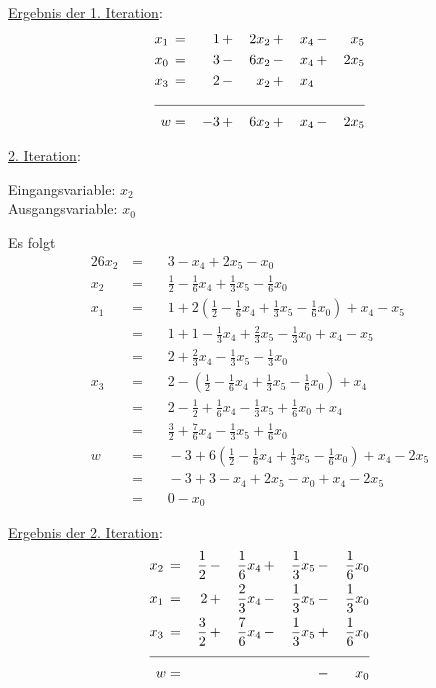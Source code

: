 \documentclass[10pt,a4paper,oneside,ngerman,numbers=noenddot]{scrartcl}
\begin{document}
		\underline{Ergebnis der 1. Iteration}:
		\begin{alignat*}{5}
			x_{1} \,&=&\, 1 \,&+&\, 2x_{2} \,&+&\, x_{4} \,&-&\, x_{5}  \\
			x_{0} \,&=&\, 3 \,&-&\, 6x_{2} \,&-&\, x_{4} \,&+&\, 2x_{5} \\
			x_{3} \,&=&\, 2 \,&-&\, x_{2} \,&+&\, x_{4} \,&& \\ \cline{1 - 9}
			w &=&\, -3 \,&+&\, 6x_{2} \,&+&\, x_{4} \,&-&\, 2x_{5}
		\end{alignat*}
		
		\underline{2. Iteration}:
		
		Eingangsvariable: $x_{2}$ \\
		Ausgangsvariable: $x_{0}$
		
		Es folgt
		\begin{alignat*}{2}
			6x_{2} \,&=&&\, 3 - x_{4} + 2x_{5} - x_{0} \\
			x_{2} \,&=&&\, \frac{1}{2} - \frac{1}{6}x_{4} + \frac{1}{3}x_{5} - \frac{1}{6}x_{0} \\
			x_{1} \,&=&&\, 1 + 2\left(\frac{1}{2} - \frac{1}{6}x_{4} + \frac{1}{3}x_{5} - \frac{1}{6}x_{0}\right) + x_{4} - x_{5} \\
			&=&&\, 1 + 1 - \frac{1}{3}x_{4} + \frac{2}{3}x_{5} - \frac{1}{3}x_{0} + x_{4} - x_{5} \\
			&=&&\, 2 + \frac{2}{3}x_{4} - \frac{1}{3}x_{5} - \frac{1}{3}x_{0} \\
			x_{3} \,&=&&\, 2 - \left(\frac{1}{2} - \frac{1}{6}x_{4} + \frac{1}{3}x_{5} - \frac{1}{6}x_{0}\right) + x_{4} \\		
			&=&&\, 2 - \frac{1}{2} + \frac{1}{6}x_{4} - \frac{1}{3}x_{5} + \frac{1}{6}x_{0} + x_{4} \\
			&=&&\, \frac{3}{2} + \frac{7}{6}x_{4} - \frac{1}{3}x_{5} + \frac{1}{6}x_{0} \\
			w \,&=&&\, -3 + 6\left(\frac{1}{2} - \frac{1}{6}x_{4} + \frac{1}{3}x_{5} - \frac{1}{6}x_{0}\right) + x_{4} - 2x_{5} \\
			&=&&\, -3 + 3 - x_{4} + 2x_{5} - x_{0} + x_{4} - 2x_{5} \\
			&=&&\, 0 - x_{0}
		\end{alignat*}
		
		\underline{Ergebnis der 2. Iteration}:
		\begin{alignat*}{5}
			x_{2} \,&=&\, \frac{1}{2} \,&-&\, \frac{1}{6}x_{4} \,&+&\, \frac{1}{3}x_{5} \,&-&\, \frac{1}{6}x_{0}  \\
			x_{1} \,&=&\, 2 \,&+&\, \frac{2}{3}x_{4} \,&-&\,\frac{1}{3}x_{5} \,&-&\, \frac{1}{3}x_{0} \\
			x_{3} \,&=&\, \frac{3}{2} \,&+&\, \frac{7}{6}x_{4} \,&-&\, \frac{1}{3}x_{5} \,&+&\, \frac{1}{6}x_{0} \\ \cline{1 - 9}
			w &=& && && &-&\, x_{0}
		\end{alignat*}
		
\end{document}
